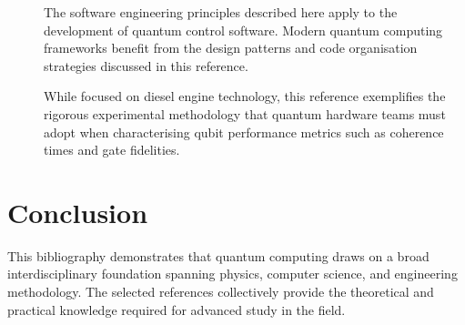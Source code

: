 \documentclass[
    language=english,
    doctype=article,
    institution=none,
    titlestyle=book,
]{../../omnilatex}
\begin{document}
\begin{description}
    \item[\cite{ramalhoFluentPython2015}] The software engineering principles
    described here apply to the development of quantum control software.  Modern
    quantum computing frameworks benefit from the design patterns and code
    organisation strategies discussed in this reference.

    \item[\cite{mollenhauerHandbuchDieselmotoren2007}] While focused on diesel
    engine technology, this reference exemplifies the rigorous experimental
    methodology that quantum hardware teams must adopt when characterising
    qubit performance metrics such as coherence times and gate fidelities.
\end{description}

\section{Conclusion}
This bibliography demonstrates that quantum computing draws on a broad
interdisciplinary foundation spanning physics, computer science, and
engineering methodology.  The selected references collectively provide the
theoretical and practical knowledge required for advanced study in the field.

\printbibliography
\end{document}
